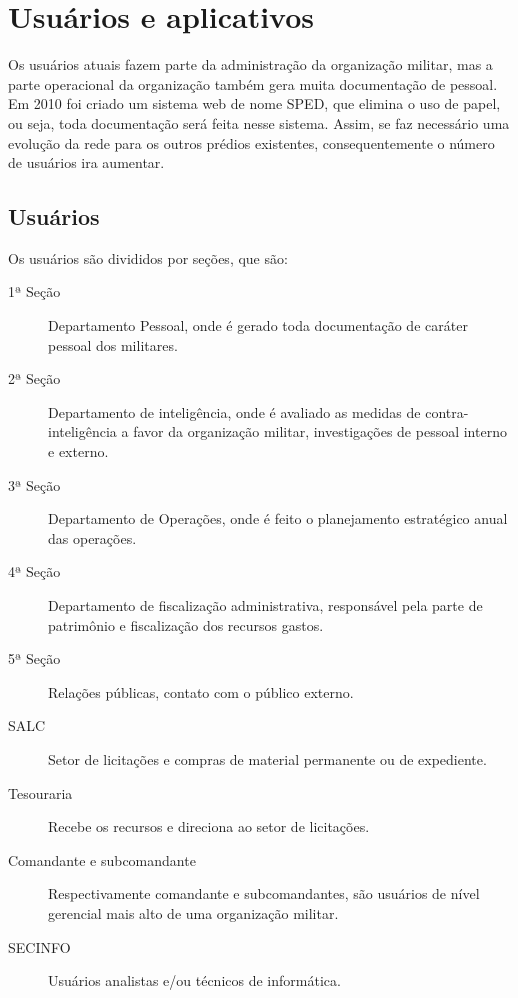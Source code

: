 \documentclass[12pt, a4paper]{article}
\begin{document}
	\section{Usuários e aplicativos}
	Os usuários atuais fazem parte da administração da organização militar, mas a parte operacional da organização também gera muita documentação de pessoal. Em 2010 foi criado um sistema web de nome SPED, que elimina o uso de papel, ou seja, toda documentação será feita nesse sistema. Assim, se faz necessário uma evolução da rede para os outros prédios existentes, consequentemente o número de usuários ira aumentar.	
	\subsection{Usuários}
	Os usuários são divididos por seções, que são:
	\begin{description}
		\item[1ª Seção] Departamento Pessoal, onde é gerado toda documentação de caráter pessoal dos militares.
		\item[2ª Seção] Departamento de inteligência, onde é avaliado as medidas de contra-inteligência a favor da organização militar, investigações de pessoal interno e externo.
		\item[3ª Seção] Departamento de Operações, onde é feito o planejamento estratégico anual das operações.
		\item[4ª Seção] Departamento de fiscalização administrativa, responsável pela parte de patrimônio e fiscalização dos recursos gastos.
		\item[5ª Seção] Relações públicas, contato com o público externo.
		\item[SALC] Setor de licitações e compras de material permanente ou de expediente.
		\item[Tesouraria] Recebe os recursos e direciona ao setor de licitações.
		\item[Comandante e subcomandante] Respectivamente comandante e subcomandantes, são usuários de nível gerencial mais alto de uma organização militar.
		\item[SECINFO] Usuários analistas e/ou técnicos de informática.
	\end{description}
	
\end{document}
